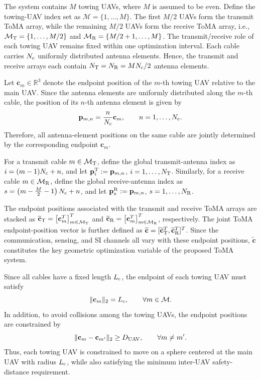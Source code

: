 \documentclass[letterpaper,journal]{IEEEtran}
\begin{document}
The system contains $M$ towing UAVs, where $M$ is assumed to be even. Define the towing-UAV index set as $\mathcal M=\{1,\ldots,M\}$. The first $M/2$ UAVs form the transmit ToMA array, while the remaining $M/2$ UAVs form the receive ToMA array, i.e., $\mathcal M_{\rm T}=\{1,\ldots,M/2\}$ and $\mathcal M_{\rm R}=\{M/2+1,\ldots,M\}$. The transmit/receive role of each towing UAV remains fixed within one optimization interval. Each cable carries $N_{\rm c}$ uniformly distributed antenna elements. Hence, the transmit and receive arrays each contain $N_{\rm T}=N_{\rm R}=MN_{\rm c}/2$ antenna elements.

Let $\mathbf c_m\in\mathbb R^3$ denote the endpoint position of the $m$-th towing UAV relative to the main UAV. Since the antenna elements are uniformly distributed along the $m$-th cable, the position of its $n$-th antenna element is given by
\begin{equation}
\mathbf p_{m,n}
=
\frac{n}{N_{\rm c}}\mathbf c_m,
\qquad
n=1,\ldots,N_{\rm c}.
\label{eq:cable_element_position}
\end{equation}
Therefore, all antenna-element positions on the same cable are jointly determined by the corresponding endpoint $\mathbf c_m$.

For a transmit cable $m\in\mathcal M_{\rm T}$, define the global transmit-antenna index as $i=(m-1)N_{\rm c}+n$, and let $\mathbf p_i^{\rm T}:=\mathbf p_{m,n}$, $i=1,\ldots,N_{\rm T}$. Similarly, for a receive cable $m\in\mathcal M_{\rm R}$, define the global receive-antenna index as $s=\left(m-\frac{M}{2}-1\right)N_{\rm c}+n$, and let $\mathbf p_s^{\rm R}:=\mathbf p_{m,n}$, $s=1,\ldots,N_{\rm R}$.

The endpoint positions associated with the transmit and receive ToMA arrays are stacked as $\widetilde{\mathbf c}_{\rm T}=\left[\mathbf c_m^T\right]_{m\in\mathcal M_{\rm T}}^T$ and $\widetilde{\mathbf c}_{\rm R}=\left[\mathbf c_m^T\right]_{m\in\mathcal M_{\rm R}}^T$, respectively. The joint ToMA endpoint-position vector is further defined as $\widetilde{\mathbf c}=[\widetilde{\mathbf c}_{\rm T}^T,\widetilde{\mathbf c}_{\rm R}^T]^T$. Since the communication, sensing, and SI channels all vary with these endpoint positions, $\widetilde{\mathbf c}$ constitutes the key geometric optimization variable of the proposed ToMA system.

Since all cables have a fixed length $L_{\rm c}$, the endpoint of each towing UAV must satisfy
\begin{equation}
\|\mathbf c_m\|_2
=
L_{\rm c},
\qquad
\forall m\in\mathcal M.
\label{eq:cable_length_constraint}
\end{equation}
In addition, to avoid collisions among the towing UAVs, the endpoint positions are constrained by
\begin{equation}
\|\mathbf c_m-\mathbf c_{m'}\|_2
\ge
D_{\rm UAV},
\qquad
\forall m\neq m'.
\label{eq:uav_distance_constraint}
\end{equation}
Thus, each towing UAV is constrained to move on a sphere centered at the main UAV with radius $L_{\rm c}$, while also satisfying the minimum inter-UAV safety-distance requirement.
\end{document}
